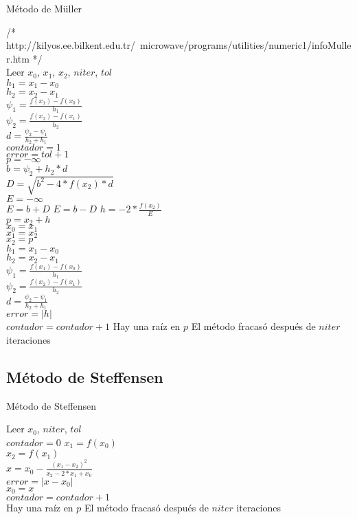 \documentclass[12pt]{article}
\begin{document}
\begin{algorithm}[H]
	
	\caption{Método de Müller}
	\SetAlgoLined
	/* http://kilyos.ee.bilkent.edu.tr/~microwave/programs/utilities/numeric1/infoMuller.htm */ \\
	Leer $x_0$, $x_1$, $x_2$, $niter$, $tol$\\
	$h_1 = x_1 - x_0$\\
	$h_2 = x_2 - x_1$\\
	$\psi_1 = \frac{f(x_1) - f(x_0)}{h_1}$\\
	$\psi_2 = \frac{f(x_2) - f(x_1)}{h_2}$\\
	$d = \frac{\psi_2 - \psi_1}{h_2 + h_1}$\\
	$contador = 1$\\
	$error = tol + 1$\\
	$p = -\infty$\\
	{
		$b = \psi_2 + h_2*d$\\
		$D = \sqrt{b^2 - 4*f(x_2)*d}$\\
		$E = -\infty$\\
		{$E = b + D$}
		{$E = b - D$}
		$h = -2 * \frac{f(x_2)}{E}$\\
		$p = x_2 + h$\\
		$x_0 = x_1$\\
		$x_1 = x_2$\\
		$x_2 = p$\\
		$h_1 = x_1 - x_0$\\
		$h_2 = x_2 - x_1$\\
		$\psi_1 = \frac{f(x_1) - f(x_0)}{h_1}$\\
		$\psi_2 = \frac{f(x_2) - f(x_1)}{h_2}$\\
		$d = \frac{\psi_2 - \psi_1}{h_2 + h_1}$\\
		$error = |h|$\\
		$contador = contador + 1$
	}
	{Hay una raíz en $p$}
	{El método fracasó después de $niter$ iteraciones}
\end{algorithm}

\subsection{Método de Steffensen}

\begin{algorithm}[H]
	\caption{Método de Steffensen}
	\SetAlgoLined
	Leer $x_0$, $niter$, $tol$\\
	$contador = 0$
	{
		$x_1 = f(x_0)$\\
		$x_2 = f(x_1)$\\
		$x = x_0 - \frac{(x_1-x_2)^2}{x_2-2*x_1+x_0}$\\
		$error = |x - x_0|$\\
		$x_0 = x$\\
		$contador = contador + 1$\\
	}
	{Hay una raíz en $p$}
	{El método fracasó después de $niter$ iteraciones}
\end{algorithm}
\end{document}
